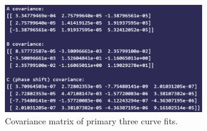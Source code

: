 \documentclass{article}
\begin{document}
\begin{figure}[ht]
    \centering

    \includegraphics[width=0.76\textwidth]{../figures/cov_code.png}

    \caption{Covariance matrix of primary three curve fits.}

    \label{fig:cov}
\end{figure}
\end{document}
